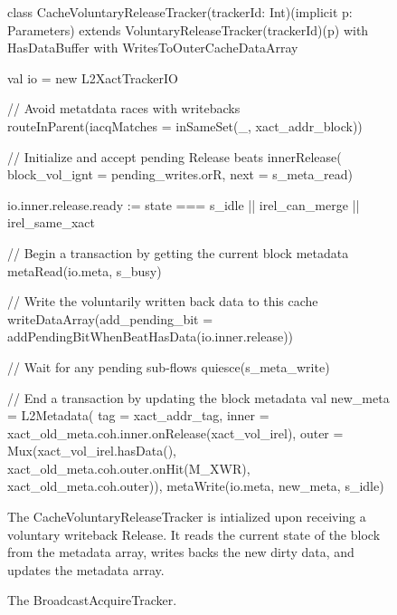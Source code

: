 \begin{figure}
\centering
\begin{scala}
class CacheVoluntaryReleaseTracker(trackerId: Int)(implicit p: Parameters)
    extends VoluntaryReleaseTracker(trackerId)(p)
    with HasDataBuffer
    with WritesToOuterCacheDataArray {
  val io = new L2XactTrackerIO

  // Avoid metatdata races with writebacks
  routeInParent(iacqMatches = inSameSet(_, xact_addr_block))

  // Initialize and accept pending Release beats
  innerRelease(
    block_vol_ignt = pending_writes.orR,
    next = s_meta_read)

  io.inner.release.ready := state === s_idle || irel_can_merge || irel_same_xact

  // Begin a transaction by getting the current block metadata
  metaRead(io.meta, s_busy)

  // Write the voluntarily written back data to this cache
  writeDataArray(add_pending_bit = addPendingBitWhenBeatHasData(io.inner.release))

  // Wait for any pending sub-flows
  quiesce(s_meta_write)

  // End a transaction by updating the block metadata
  val new_meta = 
    L2Metadata(
      tag = xact_addr_tag,
      inner = xact_old_meta.coh.inner.onRelease(xact_vol_irel),
      outer = Mux(xact_vol_irel.hasData(),
                  xact_old_meta.coh.outer.onHit(M_XWR),
                  xact_old_meta.coh.outer)),
  metaWrite(io.meta, new_meta, s_idle)       
}
\end{scala} 
\caption[The CacheVoluntaryReleaseTracker.]{
The CacheVoluntaryReleaseTracker is intialized upon receiving a voluntary writeback Release.
It reads the current state of the block from the metadata array, writes backs the new dirty data,
and updates the metadata array.
}
\label{fig:volreltracker}
\end{figure}

\begin{figure}
\centering
\begin{scala}

\end{scala} 
\caption[The BroadcastAcquireTracker.]{
The BroadcastAcquireTracker.
}
\label{fig:acqtracker}
\end{figure}


